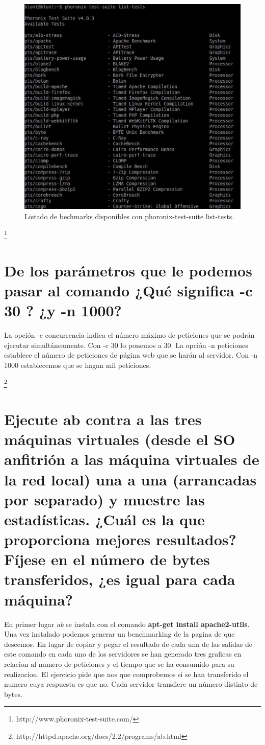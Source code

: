 \begin{figure}[H]
\begin{center}
\includegraphics[scale=0.4]{imagenes/imagen1.eps}
\caption{Listado de bechmarks disponibles con phoronix-test-suite list-tests.}
\end{center}
\end{figure}
\footnote{http://www.phoronix-test-suite.com/}
\section{De los parámetros que le podemos pasar al comando ¿Qué significa -c 30 ? ¿y -n 1000?}
La opción -c concurrencia indica el número máximo de peticiones que se podrán
ejecutar simultáneamente. Con -c 30 lo ponemos a 30.
La opción -n peticiones establece el número de peticiones de página web que se
harán al servidor. Con -n 1000 establecemos que se hagan mil peticiones.

\footnote{http://httpd.apache.org/docs/2.2/programs/ab.html}


\section{Ejecute ab contra a las tres máquinas virtuales (desde el SO anfitrión a las máquina virtuales de la red local) una a una (arrancadas por separado) y muestre las estadísticas. ¿Cuál es la que proporciona mejores resultados? Fíjese en el número de bytes transferidos, ¿es igual para cada máquina?}
En primer lugar  \textit{ab} se instala con el comando \textbf{apt-get install apache2-utils}. Una vez instalado podemos generar un benchmarking de la pagina de que deseemos.
En lugar de copiar y pegar el resultado de cada una de las salidas de este comando en cada uno de los servidores se han generado tres graficas en relacion al numero de peticiones y el tiempo que se ha consumido para su realizacion.
El ejercicio pide que nos que comprobemos si se han transferido el numero cuya respuesta es que no. Cada servidor transfiere un número distinto de bytes.

